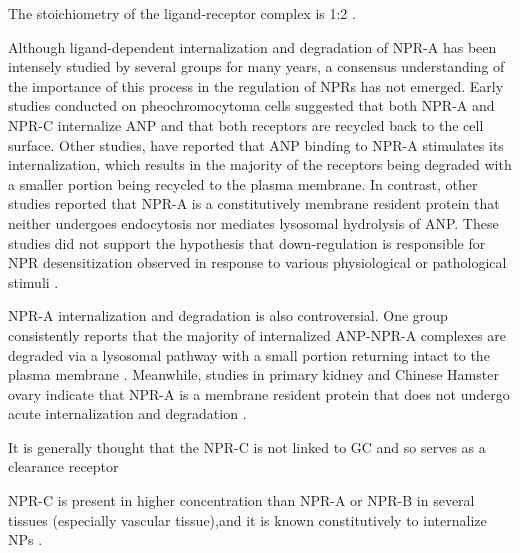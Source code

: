 \documentclass[14pt,a4paper,onecolumn]{extarticle}
\begin{document}


The stoichiometry of the ligand-receptor complex is 1:2 \citep{177}. %


Although ligand-dependent internalization and degradation of NPR-A has been intensely studied by several groups for many years, a consensus understanding of the importance of this process in the regulation of NPRs has not emerged. Early studies conducted on pheochromocytoma cells suggested that both NPR-A and NPR-C internalize ANP and that both receptors are recycled back to the cell surface. Other studies, have reported that ANP binding to NPR-A stimulates its internalization, which results in the majority of the receptors being degraded with a smaller portion being recycled to the plasma membrane. In contrast, other studies reported that NPR-A is a constitutively membrane resident protein that neither undergoes endocytosis nor mediates lysosomal hydrolysis of ANP.  These studies did not support the hypothesis that down-regulation is responsible for NPR desensitization observed in response to various physiological or pathological stimuli \citep{182}.

NPR-A internalization and degradation is also controversial. One group consistently reports that the majority of internalized ANP-NPR-A complexes are degraded via a lysosomal pathway with a small portion returning intact to the plasma membrane \citep{Pandey2002}. Meanwhile, studies in primary kidney and Chinese Hamster ovary indicate that NPR-A is a membrane resident protein that does not undergo acute internalization and degradation \citep{Fan2005} \citep{Vieira2001}. %

It is generally thought that the NPR-C is not linked to GC and so serves as a clearance receptor \citep{bib35}%

NPR-C is present in higher concentration than NPR-A or NPR-B in several tissues (especially vascular tissue),and it is known constitutively to internalize NPs \citep{172}.
\end{document}
